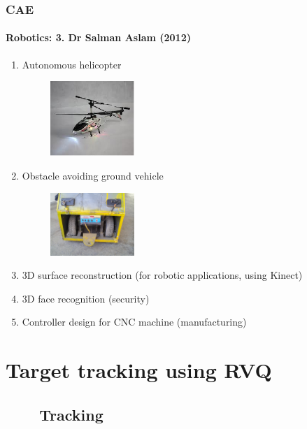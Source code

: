 \begin{frame}
\frametitle{CAE}
\framesubtitle{Robotics: 3.  Dr Salman Aslam (2012)}
\mypagenum{}
\begin{enumerate}\scriptsize
\item Autonomous helicopter
\begin{figure}
\centering
\includegraphics[width=0.3\textwidth]{figs/helicopter.png}
\end{figure}
\item Obstacle avoiding ground vehicle
\begin{figure}
\centering
\includegraphics[width=0.3\textwidth]{figs/car.png}
\end{figure}
\item 3D surface reconstruction (for robotic applications, using Kinect)
\item 3D face recognition (security)
\item Controller design for CNC machine (manufacturing)
\end{enumerate}
\end{frame}







\section{Target tracking using RVQ}
\subsection{\ \ \ \ Tracking}

